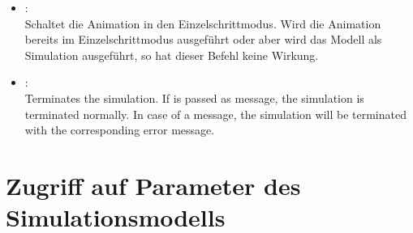 \begin{itemize}
\item
{}:\\
Schaltet die Animation in den Einzelschrittmodus. Wird die Animation bereits im Einzelschrittmodus
ausgeführt oder aber wird das Modell als Simulation ausgeführt, so hat dieser Befehl keine Wirkung.

\item
{}:\\
Terminates the simulation. If  is passed as message, the simulation is terminated normally.
In case of a message, the simulation will be terminated with the corresponding error message.

\end{itemize}

\section{Zugriff auf Parameter des Simulationsmodells}

